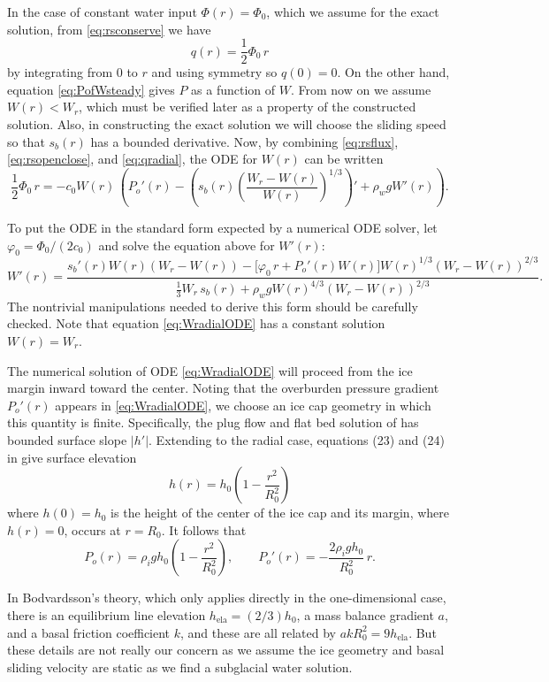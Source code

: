 \documentclass[11pt,final]{amsart}%
\begin{document}
In the case of constant water input $\Phi(r)=\Phi_0$, which we assume for the exact solution, from \eqref{eq:rsconserve} we have
\begin{equation}
q(r) = \frac{1}{2} \Phi_0\, r \label{eq:qradial}
\end{equation}
by integrating from $0$ to $r$ and using symmetry so $q(0)=0$.  On the other hand, equation \eqref{eq:PofWsteady} gives $P$ as a function of $W$.  From now on we assume $W(r) < W_r$, which must be verified later as a property of the constructed solution.  Also, in constructing the exact solution we will choose the sliding speed so that $s_b(r)$ has a bounded derivative.    Now, by combining \eqref{eq:rsflux}, \eqref{eq:rsopenclose}, and \eqref{eq:qradial}, the ODE for $W(r)$ can be written
	$$\frac{1}{2} \Phi_0\, r = - c_0 W(r)\, \left(P_o'(r) - \left(s_b(r) \left(\frac{W_r - W(r)}{W(r)}\right)^{1/3}\right)' + \rho_w g W'(r)\right).$$

To put the ODE in the standard form expected by a numerical ODE solver, let $\varphi_0 = \Phi_0 / (2 c_0)$ and solve the equation above for $W'(r)$:
\begin{equation}
W'(r) = \frac{s_b'(r) W(r) \left(W_r - W(r)\right) - \Big[\varphi_0\, r + P_o'(r) W(r)\Big] W(r)^{1/3} \left(W_r - W(r)\right)^{2/3}}{\frac{1}{3} W_r\, s_b(r) + \rho_w g W(r)^{4/3} \left(W_r - W(r)\right)^{2/3}}.
\label{eq:WradialODE}
\end{equation}
The nontrivial manipulations needed to derive this form should be carefully checked.  Note that equation \eqref{eq:WradialODE} has a constant solution $W(r)=W_r$.

The numerical solution of ODE \eqref{eq:WradialODE} will proceed from the ice margin inward toward the center.  Noting that the overburden pressure gradient $P_o'(r)$ appears in \eqref{eq:WradialODE}, we choose an ice cap geometry in which this quantity is finite.  Specifically, the plug flow and flat bed solution of \cite{Bodvardsson} has bounded surface slope $|h'|$.  Extending to the radial case, equations (23) and (24) in \cite{Bodvardsson} give surface elevation
    $$h(r) = h_0 \left(1 - \frac{r^2}{R_0^2} \right)$$
where $h(0)=h_0$ is the height of the center of the ice cap and its margin, where $h(r)=0$, occurs at $r=R_0$.  It follows that
    $$P_o(r) = \rho_i g h_0 \left(1 - \frac{r^2}{R_0^2} \right), \qquad P_o'(r) = - \frac{2\rho_i g h_0}{R_0^2}\, r.$$

In Bodvardsson's theory, which only applies directly in the one-dimensional case, there is an equilibrium line elevation $h_{\text{ela}}=(2/3) h_0$, a mass balance gradient $a$, and a basal friction coefficient $k$, and these are all related by $a k R_0^2 = 9 h_{\text{ela}}$.  But these details are not really our concern as we assume the ice geometry and basal sliding velocity are static as we find a subglacial water solution.
\end{document}
